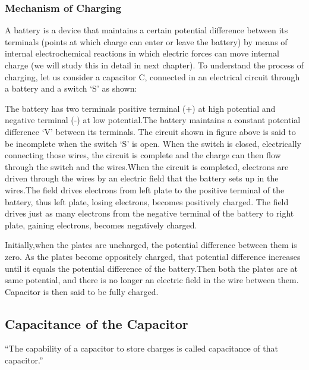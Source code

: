 \subsubsection{Mechanism of Charging}
A battery is a device that maintains a certain potential difference
between its terminals (points at which charge can enter or leave the battery)
by means of internal electrochemical reactions in which electric forces
can move internal charge (we will study this in detail in next chapter).
To understand the process of charging, let us consider a capacitor C,
connected in an electrical circuit through a battery and a switch ‘S’ as
shown:


The battery has two terminals positive terminal (+) at high potential and
negative terminal (-) at low potential.The battery maintains a constant
potential difference ‘V’ between its terminals. The circuit shown in figure
above is said to be incomplete when the switch ‘S’ is open.
When the switch is closed, electrically connecting those wires,
the circuit is complete and the charge can then flow through the
switch and the wires.When the circuit is completed,
electrons are driven through the wires by an electric field that the
battery sets up in the wires.The field drives electrons from left plate
to the positive terminal of the battery, thus left plate, losing electrons,
becomes positively charged. The field drives just as many electrons from
the negative terminal of the battery to right plate, gaining electrons,
becomes negatively charged.

Initially,when the plates are uncharged, the potential difference between
them is zero. As the plates become oppositely charged, that potential
difference increases until it equals the potential difference of the
battery.Then both the plates are at same potential, and there is no longer
an electric field in the wire between them.
Capacitor is then said to be fully charged.
\subsection{Capacitance of the Capacitor}
“The capability of a capacitor to store charges is called
capacitance of that capacitor.”
